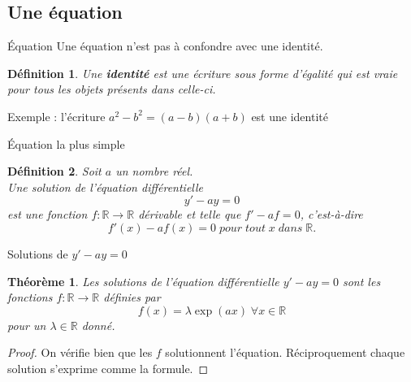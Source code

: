 \documentclass[11pt]{beamer}
\newtheorem{dfn}{Définition}
\newtheorem{thm}{Théorème}
\begin{document}
\subsection{Une équation}
\begin{frame}{Équation}
Une équation n'est pas à confondre avec une identité.
\begin{dfn}
Une \textbf{identité} est une écriture sous forme d'égalité qui est vraie pour tous les objets présents dans celle-ci.
\end{dfn}
Exemple : l'écriture $a^2-b^2=(a-b)(a+b)$ est une identité
\end{frame}
\begin{frame}{Équation la plus simple}
\begin{dfn}
Soit $a$ un nombre réel.\\
Une solution de l'équation différentielle 
$$y'-ay=0$$
est une fonction $f:\mathbb{R}\rightarrow\mathbb{R}$ dérivable et telle que $f'-af=0$, c'est-à-dire
$$f'(x)-af(x)=0 \; pour\; tout\; x\; dans \; \mathbb{R}.$$ 
\end{dfn}
\end{frame}
\begin{frame}{Solutions de $y'-ay=0$}
\begin{thm}
Les solutions de l'équation différentielle $y'-ay=0$ sont les fonctions $f:\mathbb{R}\rightarrow\mathbb{R}$ définies par 
$$f(x)=\lambda \exp(ax)  \; \forall x \in \mathbb{R}$$
pour un $\lambda\in\mathbb{R}$ donné.
\end{thm}
\begin{proof}
On vérifie bien que les $f$ solutionnent l'équation.
Réciproquement chaque solution s'exprime comme la formule.
\end{proof}

\end{frame}
\end{document}

